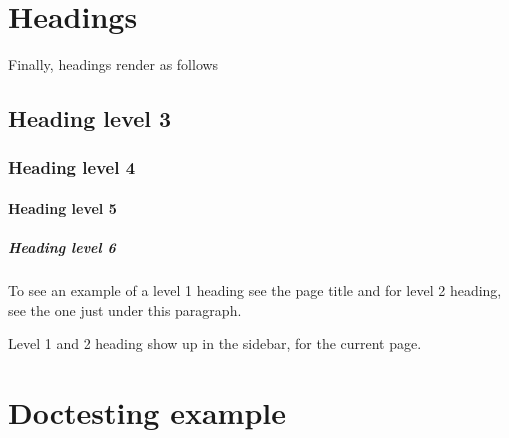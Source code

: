 \section{Headings}



\label{6050578807165678454}{}


Finally, headings render as follows



\subsection{Heading level 3}



\label{9775017510164578956}{}


\subsubsection{Heading level 4}



\label{4326479258521583833}{}


\paragraph{Heading level 5}\indent



\label{4462917165226381956}{}


\subparagraph{Heading level 6}\indent



\label{5887663547138942707}{}


To see an example of a level 1 heading see the page title and for level 2 heading, see the one just under this paragraph.



\begin{tcolorbox}[toptitle=-1mm,bottomtitle=1mm,colback=admonition-note!50!white,colframe=admonition-note,title=\textbf{Headings in sidebars}]
Level 1 and 2 heading show up in the sidebar, for the current page.

\end{tcolorbox}


\section{Doctesting example}



\label{8722001133690104801}{}


